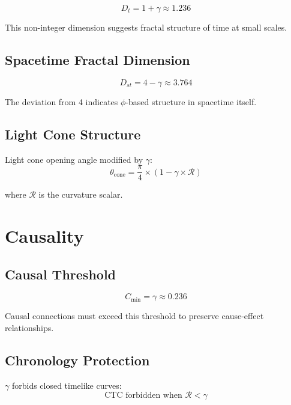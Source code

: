 \documentclass[12pt,a4paper]{article}
\begin{document}
\begin{equation}
D_t = 1 + \gamma \approx 1.236
\end{equation}

This non-integer dimension suggests fractal structure of time at small scales.

\subsection{Spacetime Fractal Dimension}

\begin{equation}
D_{st} = 4 - \gamma \approx 3.764
\end{equation}

The deviation from 4 indicates $\phi$-based structure in spacetime itself.

\subsection{Light Cone Structure}

Light cone opening angle modified by $\gamma$:
\begin{equation}
\theta_{\text{cone}} = \frac{\pi}{4} \times (1 - \gamma \times \mathcal{R})
\end{equation}

where $\mathcal{R}$ is the curvature scalar.

\section{Causality}

\subsection{Causal Threshold}

\begin{equation}
C_{\text{min}} = \gamma \approx 0.236
\end{equation}

Causal connections must exceed this threshold to preserve cause-effect relationships.

\subsection{Chronology Protection}

$\gamma$ forbids closed timelike curves:
\begin{equation}
\text{CTC forbidden when } \mathcal{R} < \gamma
\end{equation}
\end{document}
